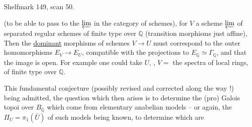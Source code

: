 Shelfmark 149, scan 50.

(to be able to pass to the $\varprojlim$ in the category of schemes), for $V$ a scheme $\varprojlim$ of separated regular schemes of finite type over $\mathbb{Q}$ (transition morphisms  just affine), Then the \uline{dominant} morphisms of schemes $V\longrightarrow U$ must correspond to the outer homomorphisms $E_V\longrightarrow E_U$, compatible with the projections to $E_{\mathbb{Q}}\simeq\Gamma_{\mathbb{Q}}$, and  that the image is open. For example one could take  $U$, , $V=$ the spectra of local rings,  of finite type over $\mathbb{Q}$.


This fundamental conjecture (possibly revised and corrected along the way !) being admitted, the question which then arises is to determine the (pro) Galois topoi over $B_{\mathbb{Q}}$ which come from elementary anabelian models -- or again, the $\Pi_U=\pi_1(\bar U)$ of such models being known, to determine which are
